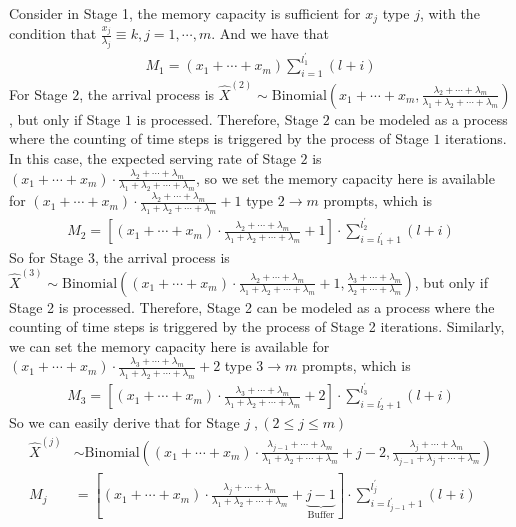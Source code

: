 \documentclass[opre, nonblindrev]{informs3} %
\begin{document}
Consider in Stage 1, the memory capacity is sufficient for $x_j$ type $j$, with the condition that $\frac{x_j}{\lambda_j}\equiv k, j=1,\cdots,m$. And we have that
\begin{align*}
    M_1 = (x_1+\cdots+x_m)\sum_{i=1}^{l_1^{\prime}}(l+i)
\end{align*}
For Stage $2$, the arrival process is $\hat{X}^{(2)}\sim \text{Binomial}(x_{1}+\cdots+x_m, \frac{\lambda_{2}+\cdots+\lambda_m}{\lambda_{1}+\lambda_{2}+\cdots+\lambda_m})$, but only if Stage $1$ is processed. Therefore, Stage $2$ can be modeled as a process where the counting of time steps is triggered by the process of Stage $1$ iterations. In this case, the expected serving rate of Stage $2$ is $(x_{1}+\cdots+x_m)\cdot \frac{\lambda_{2}+\cdots+\lambda_m}{\lambda_{1}+\lambda_{2}+\cdots+\lambda_m}$, so we set the memory capacity here is available for $(x_{1}+\cdots+x_m)\cdot \frac{\lambda_{2}+\cdots+\lambda_m}{\lambda_{1}+\lambda_{2}+\cdots+\lambda_m}+1$ type $2\to m$ prompts, which is 
\begin{align*}
M_2 = \left[(x_{1}+\cdots+x_m)\cdot \frac{\lambda_{2}+\cdots+\lambda_m}{\lambda_{1}+\lambda_{2}+\cdots+\lambda_m}+1\right]\cdot \sum_{i=l_{1}^{\prime}+1}^{l_2^{\prime}}(l+i)
\end{align*}
So for Stage 3, the arrival process is $\hat{X}^{(3)}\sim \text{Binomial}\left((x_{1}+\cdots+x_m)\cdot \frac{\lambda_{2}+\cdots+\lambda_m}{\lambda_{1}+\lambda_{2}+\cdots+\lambda_m}+1, \frac{\lambda_3+\cdots+\lambda_m}{\lambda_2+\cdots+\lambda_m}\right)$, but only if Stage 2 is processed. Therefore, Stage 2 can be modeled as a process where the counting of time steps is triggered by the process of Stage 2 iterations. Similarly, we can set  the memory capacity here is available for $(x_{1}+\cdots+x_m)\cdot \frac{\lambda_{3}+\cdots+\lambda_m}{\lambda_{1}+\lambda_{2}+\cdots+\lambda_m}+2$ type $3\to m$ prompts, which is 
\begin{align*}
M_3 = \left[(x_{1}+\cdots+x_m)\cdot \frac{\lambda_{3}+\cdots+\lambda_m}{\lambda_{1}+\lambda_{2}+\cdots+\lambda_m}+2 \right]\cdot \sum_{i=l_{2}^{\prime}+1}^{l_3^{\prime}}(l+i)
\end{align*}
So we can easily derive that for Stage $j\;,(2\leq j\leq m)$
\begin{align*}
    \hat{X}^{(j)}&\sim \text{Binomial}\left((x_{1}+\cdots+x_m)\cdot \frac{\lambda_{j-1}+\cdots+\lambda_m}{\lambda_{1}+\lambda_{2}+\cdots+\lambda_m}+j-2, \frac{\lambda_j+\cdots+\lambda_m}{\lambda_{j-1}+\lambda_j+\cdots+\lambda_m}\right)\\
    M_j&= \left[(x_{1}+\cdots+x_m)\cdot \frac{\lambda_{j}+\cdots+\lambda_m}{\lambda_{1}+\lambda_{2}+\cdots+\lambda_m}+\underbrace{j-1}_{\text{Buffer}} \right]\cdot \sum_{i=l_{j-1}^{\prime}+1}^{l_j^{\prime}}(l+i)
\end{align*}
\end{document}
